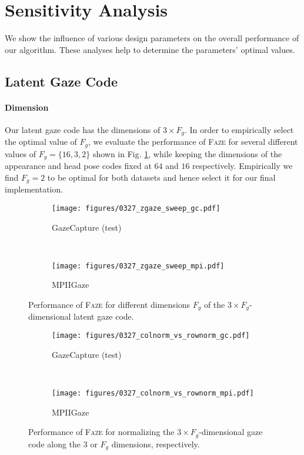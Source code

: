 \documentclass[10pt,twocolumn,letterpaper]{article}
\newcommand{\faze}[0]{\textsc{Faze}\xspace}
\begin{document}
\section{Sensitivity Analysis}
\noindent
We show the influence of various design parameters on the overall performance of our algorithm. These analyses help to determine the parameters' optimal values. 

\subsection{Latent Gaze Code}

\paragraph{Dimension}

Our latent gaze code has the dimensions of $3\times F_g$. In order to empirically select the optimal value of $F_g$, we evaluate the performance of \faze for several different values of $F_g = \{16, 3, 2\}$ shown in Fig. \ref{fig:gaze_code_dim}, while keeping the dimensions of the appearance and head pose codes fixed at $64$ and $16$ respectively. Empirically we find $F_g=2$ to be optimal for both datasets and hence select it for our final implementation.

\begin{figure}[]
    \vspace*{3cm}
    \centering
    \begin{subfigure}[b]{\columnwidth}
        \texttt{[image: figures/0327\_zgaze\_sweep\_gc.pdf]}
        \caption{GazeCapture (test)}
    \end{subfigure} \\
    \begin{subfigure}[b]{\columnwidth}
        \texttt{[image: figures/0327\_zgaze\_sweep\_mpi.pdf]}
        \caption{MPIIGaze}
    \end{subfigure}
    \caption{Performance of \faze for different dimensions $F_g$ of the $3\times F_g$-dimensional latent gaze code.}
    \label{fig:gaze_code_dim}
    \vspace*{3cm}
\end{figure}

\begin{figure}[]
    \centering
    \begin{subfigure}[b]{\columnwidth}
        \texttt{[image: figures/0327\_colnorm\_vs\_rownorm\_gc.pdf]}
        \caption{GazeCapture (test)}
    \end{subfigure} \\
    \begin{subfigure}[b]{\columnwidth}
        \texttt{[image: figures/0327\_colnorm\_vs\_rownorm\_mpi.pdf]}
        \caption{MPIIGaze}
    \end{subfigure}
    \caption{Performance of \faze for normalizing the $3\times F_g$-dimensional gaze code along the $3$ or $F_g$ dimensions, respectively. 
    }
    \label{fig:gaze_code_norm}
\end{figure}
\end{document}
